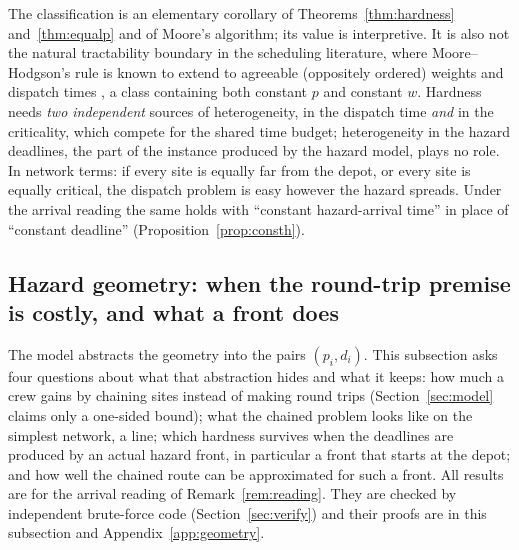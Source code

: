 \documentclass[pdflatex,sn-mathphys-ay]{sn-jnl}
\theoremstyle{thmstyleone}
\theoremstyle{thmstyletwo}
\theoremstyle{thmstylethree}
\begin{document}
The classification is an elementary corollary of
Theorems~\ref{thm:hardness} and~\ref{thm:equalp} and of Moore's
algorithm; its value is interpretive. It is also not the natural
tractability boundary in the scheduling literature, where
Moore--Hodgson's rule is known to extend to agreeable (oppositely
ordered) weights and dispatch times \citep{lawler1976}, a class
containing both constant $p$ and constant $w$. Hardness
needs \emph{two independent} sources of heterogeneity, in the dispatch
time \emph{and} in the criticality, which compete for the shared time
budget; heterogeneity in the hazard deadlines, the part of the instance
produced by the hazard model, plays no role. In network terms: if every
site is equally far from the depot, or every site is equally critical,
the dispatch problem is easy however the hazard spreads. Under the
arrival reading the same holds with ``constant hazard-arrival time'' in
place of ``constant deadline'' (Proposition~\ref{prop:consth}).

\subsection{Hazard geometry: when the round-trip premise is costly, and what a front does}\label{sec:geometry}

The model abstracts the geometry into the pairs $(p_i,d_i)$. This
subsection asks four questions about what that abstraction hides and
what it keeps: how much a crew gains by chaining sites instead of making
round trips (Section~\ref{sec:model} claims only a one-sided bound); what
the chained problem looks like on the simplest network, a line; which
hardness survives when the deadlines are produced by an actual hazard
front, in particular a front that starts at the depot; and how well the
chained route can be approximated for such a front. All results are
for the arrival reading of Remark~\ref{rem:reading}. They are checked by
independent brute-force code (Section~\ref{sec:verify}) and their proofs
are in this subsection and Appendix~\ref{app:geometry}.
\end{document}
